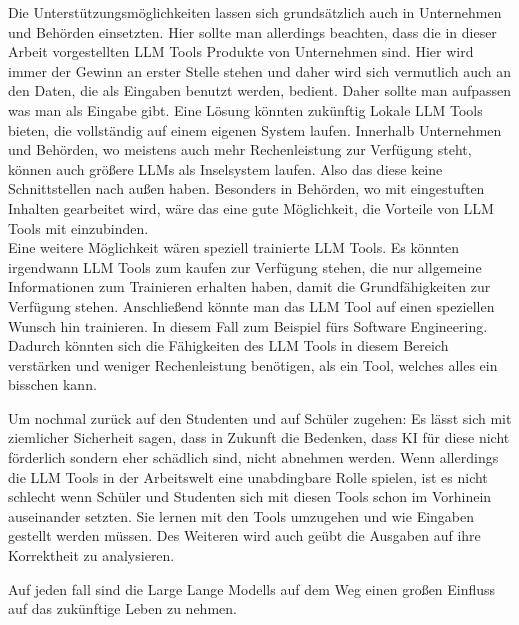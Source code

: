 Die Unterstützungsmöglichkeiten lassen sich grundsätzlich auch in Unternehmen und Behörden einsetzten. Hier sollte man 
allerdings beachten, dass die in dieser Arbeit vorgestellten LLM Tools Produkte von Unternehmen sind. Hier wird immer 
der Gewinn an erster Stelle stehen und daher wird sich vermutlich auch an den Daten, die als Eingaben benutzt werden, 
bedient. Daher sollte man aufpassen was man als Eingabe gibt. Eine Lösung könnten zukünftig Lokale LLM Tools bieten,
die vollständig auf einem eigenen System laufen. Innerhalb Unternehmen und Behörden, wo meistens auch mehr Rechenleistung 
zur Verfügung steht, können auch größere LLMs als Inselsystem laufen. Also das diese keine Schnittstellen nach außen 
haben. Besonders in Behörden, wo mit eingestuften Inhalten gearbeitet wird, wäre das eine gute Möglichkeit, die Vorteile 
von LLM Tools mit einzubinden.\\
Eine weitere Möglichkeit wären speziell trainierte LLM Tools. Es könnten irgendwann LLM Tools zum kaufen zur 
Verfügung stehen, die nur allgemeine Informationen zum Trainieren erhalten haben, damit die Grundfähigkeiten zur 
Verfügung stehen. Anschließend könnte man das LLM Tool auf einen speziellen Wunsch hin trainieren. In diesem 
Fall zum Beispiel fürs Software Engineering. Dadurch könnten sich die Fähigkeiten des LLM Tools in diesem Bereich 
verstärken und weniger Rechenleistung benötigen, als ein Tool, welches alles ein bisschen kann.

Um nochmal zurück auf den Studenten und auf Schüler zugehen: Es lässt sich mit ziemlicher Sicherheit sagen, 
dass in Zukunft die Bedenken, dass KI für diese nicht förderlich sondern eher schädlich sind, nicht abnehmen 
werden. Wenn allerdings die LLM Tools in der Arbeitswelt eine unabdingbare Rolle spielen, ist es nicht schlecht 
wenn Schüler und Studenten sich mit diesen Tools schon im Vorhinein auseinander setzten. Sie lernen mit den Tools 
umzugehen und wie Eingaben gestellt werden müssen. Des Weiteren wird auch geübt die Ausgaben auf ihre Korrektheit 
zu analysieren.

Auf jeden fall sind die Large Lange Modells auf dem Weg einen großen Einfluss auf das zukünftige Leben zu nehmen.